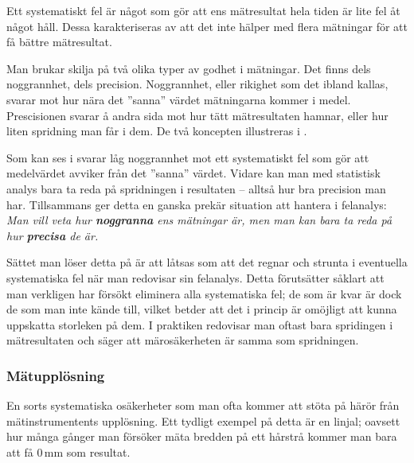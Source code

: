 \documentclass[11pt,a4paper, english, swedish
]{article}
\begin{document}
Ett systematiskt fel är något som gör att ens mätresultat hela tiden
är lite fel åt något håll\footnotemark{}. Dessa karakteriseras av att
det inte hälper med flera mätningar för att få bättre mätresultat.

Man brukar skilja på två olika typer av godhet i mätningar. Det finns
dels noggrannhet, dels precision. Noggrannhet, eller rikighet som det
ibland kallas, svarar mot hur nära det ''sanna''\footnotemark{} värdet
mätningarna kommer i medel. Prescisionen svarar å andra sida mot hur
tätt mätresultaten hamnar, eller hur liten spridning man får i dem. De
två koncepten illustreras i .  

Som kan ses i  svarar låg noggrannhet mot ett
systematiskt fel som gör att medelvärdet avviker från det ''sanna''
värdet. Vidare kan man med statistisk analys bara ta reda på
spridningen i resultaten -- alltså hur bra precision man
har. Tillsammans ger detta en ganska prekär situation att hantera i
felanalys: 
\emph{Man vill veta hur {\bf noggranna} ens mätningar är, men man kan bara
  ta reda på hur {\bf precisa} de är.} 

Sättet man löser detta på är att låtsas som att det regnar och strunta
i eventuella systematiska fel när man redovisar sin felanalys. Detta
förutsätter såklart att man verkligen har försökt eliminera alla
systematiska fel; de som är kvar är dock de som man inte kände till,
vilket betder att det i princip är omöjligt att kunna uppskatta
storleken på dem. I praktiken redovisar man oftast bara spridingen i
mätresultaten och säger att märosäkerheten är samma som spridningen. 

\subsubsection{Mätupplösning}
En sorts systematiska\footnotemark{} osäkerheter som man ofta kommer
att stöta på härör från mätinstrumentents upplösning. Ett tydligt
exempel på detta är en linjal; oavsett hur många gånger man försöker
mäta bredden på ett hårstrå kommer man bara att få 0\,mm som
resultat. 
\end{document}
